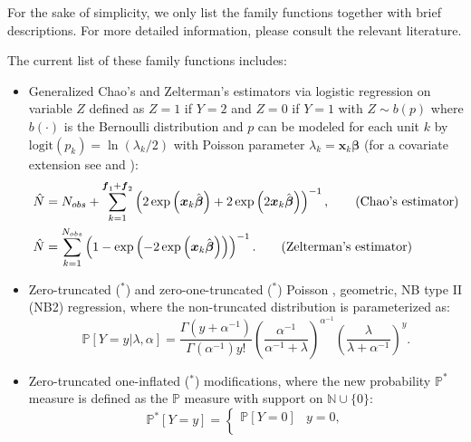 \documentclass[
]{jss}
\newcommand{\1}{\mathcal{I}} \newcommand{\bZero}{\boldsymbol{0}}
\begin{document}
For the sake of simplicity, we only list the family functions together
with brief descriptions. For more detailed information, please consult
the relevant literature.

The current list of these family functions includes:

\begin{itemize}
    \item Generalized Chao's \citep{chao1987estimating} and Zelterman's \citep{zelterman1988robust} estimators via logistic regression on variable $Z$ defined as $Z=1$ if $Y=2$ and $Z=0$ if $Y=1$ with $Z\sim b(p)$ where $b(\cdot)$ is the Bernoulli distribution and $p$ can be modeled for each unit $k$ by $\text{logit}(p_k)=\ln(\lambda_k/2)$ with Poisson parameter $\lambda_k=\boldsymbol{x}_{k}\boldsymbol{\beta}$ (for a covariate extension see \cite{chao-generalization} and \cite{zelterman}):
    \begin{align}
        \hat{N} &= N_{obs}+
        \sum_{k=1}^{\boldsymbol{f}_{1}+\boldsymbol{f}_{2}}
        \left(2\exp\left(\boldsymbol{x}_{k}\hat{\boldsymbol{\beta}}\right)+
        2\exp\left(2\boldsymbol{x}_{k}\hat{\boldsymbol{\beta}}\right)\right)^{-1},
        \tag{\text{Chao's estimator}}\\
        \hat{N}&=\sum_{k=1}^{N_{obs}}
        \left(1-\exp\left(-2\exp\left(\boldsymbol{x}_{k}\hat{\boldsymbol{\beta}}\right)\right)\right)^{-1}.
        \tag{\text{Zelterman's estimator}}
    \end{align}
    \item Zero-truncated ($^\ast$) and zero-one-truncated ($^\ast$) Poisson \citep[cf. ][]{zotmodels}, geometric, NB type II (NB2) regression, where the non-truncated distribution is parameterized as:
    \begin{equation*}
        \mathbb{P}[Y=y|\lambda,\alpha] = \frac{\Gamma\left(y+\alpha^{-1}\right)}{\Gamma\left(\alpha^{-1}\right)y!}
        \left(\frac{\alpha^{-1}}{\alpha^{-1}+\lambda}\right)^{\alpha^{-1}}
        \left(\frac{\lambda}{\lambda + \alpha^{-1}}\right)^{y}.
    \end{equation*}
    \item Zero-truncated one-inflated ($^\ast$) modifications, where the new probability $\mathbb{P}^{\ast}$ measure is defined as the $\mathbb{P}$ measure with support on $\mathbb{N}\cup\{0\}$:
    \begin{equation*}
    \mathbb{P}^{\ast}[Y=y]=
    \begin{cases}
    \mathbb{P}[Y=0] & y=0, \\

\end{cases}
\end{equation*}
\end{itemize}
\end{document}
